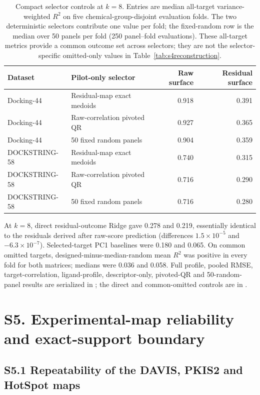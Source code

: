 \documentclass[11pt]{article}
\begin{document}
\begin{table}[htbp]
\centering
\caption{Compact selector controls at $k=8$. Entries are median all-target
variance-weighted $R^2$ on five chemical-group-disjoint evaluation folds. The
two deterministic selectors contribute one value per fold; the fixed-random
row is the median over 50 panels per fold (250 panel--fold evaluations). These
all-target metrics provide a common outcome set across selectors; they are not
the selector-specific omitted-only values in Table~\ref{tab:s4reconstruction}.}
\label{tab:s4selectorcontrols}
\small
\begin{tabular}{llrr}
\toprule
Dataset & Pilot-only selector & Raw surface & Residual surface \\
\midrule
Docking-44 & Residual-map exact medoids & 0.918 & 0.391 \\
Docking-44 & Raw-correlation pivoted QR & 0.927 & 0.365 \\
Docking-44 & 50 fixed random panels & 0.904 & 0.359 \\
\addlinespace
DOCKSTRING-58 & Residual-map exact medoids & 0.740 & 0.315 \\
DOCKSTRING-58 & Raw-correlation pivoted QR & 0.716 & 0.290 \\
DOCKSTRING-58 & 50 fixed random panels & 0.716 & 0.280 \\
\bottomrule
\end{tabular}
\end{table}

At $k=8$, direct residual-outcome Ridge gave 0.278 and 0.219, essentially
identical to the residuals derived after raw-score prediction (differences
$1.5\times10^{-5}$ and $-6.3\times10^{-7}$). Selected-target PC1 baselines were
0.180 and 0.065. On common omitted targets, designed-minus-median-random mean
$R^2$ was positive in every fold for both matrices; medians were 0.036 and
0.058. Full profile, pooled RMSE, target-correlation, ligand-profile,
descriptor-only, pivoted-QR and 50-random-panel results are serialized in
; the direct and common-omitted
controls are in .

\section*{S5. Experimental-map reliability and exact-support boundary}

\subsection*{S5.1 Repeatability of the DAVIS, PKIS2 and HotSpot maps}
\end{document}
